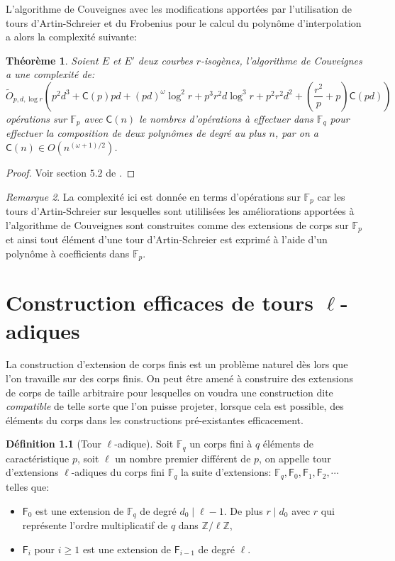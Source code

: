 \documentclass[10pt,a4paper]{book}
\theoremstyle{plain}
\newtheorem{thm}{Théorème}[chapter]
\theoremstyle{definition}
\theoremstyle{definition}
\theoremstyle{definition}
\theoremstyle{definition}
\newtheorem{defi}[thm]{Définition}
\theoremstyle{remark}
\newtheorem{rem}[thm]{Remarque}
\theoremstyle{remark}
\theoremstyle{definition}
\begin{document}
L'algorithme de Couveignes avec les modifications apportées par l'utilisation de tours d'Artin-Schreier et du Frobenius pour le calcul du polynôme d'interpolation a alors la complexité suivante:

\begin{thm}
Soient $E$ et $E'$ deux courbes $r$-isogènes, l'algorithme de Couveignes a une complexité de:
\[
\tilde{O}_{p,d,\log r}(p^2d^3+\mathsf{C}(p)pd+(pd)^{\omega}\log^2 r + p^3 r^2 d \log^3 r + p^2r^2d^2+(\frac{r^2}{p}+p)\mathsf{C}(pd))
\]
opérations sur $\mathbb{F}_p$ avec $\mathsf{C}(n)$ le nombres d'opérations à effectuer dans $\mathbb{F}_q$ pour effectuer la composition de deux polynômes de degré au plus $n$, par \cite{BrentKung78} on a $\mathsf{C}(n) \in O(n^{(\omega+1)/2})$.
\end{thm}

\begin{proof}
Voir section $5.2$ de \cite{DeFeo11}.
\end{proof}

\begin{rem}
La complexité ici est donnée en terms d'opérations sur $\mathbb{F}_p$ car les 
tours d'Artin-Schreier sur lesquelles sont utililisées les améliorations 
apportées à l'algorithme de Couveignes sont construites comme des extensions de
corps sur $\mathbb{F}_p$ et ainsi tout élément d'une tour d'Artin-Schreier est
exprimé à l'aide d'un polynôme à coefficients dans $\mathbb{F}_p$.
\end{rem}

\chapter{Construction efficaces de tours $\ell$-adiques}
\label{cha:tour}
La construction d'extension de corps finis est un problème naturel dès lors que l'on travaille sur des corps finis. On peut être amené à construire des extensions de corps de taille arbitraire pour lesquelles on voudra une construction dite \textit{compatible} de telle sorte que l'on puisse projeter, lorsque cela est possible, des éléments du corps dans les constructions pré-existantes efficacement.

\begin{defi}[Tour \textit{$\ell$}-adique]
\label{def:tour-ell}
Soit $\mathbb{F}_q$ un corps fini à $q$ éléments de caractéristique $p$, soit $\ell$ un nombre premier différent de $p$, on appelle tour d'extensions $\ell$-adiques du corps fini $\mathbb{F}_q$ la suite d'extensions: $\mathbb{F}_q, \mathsf{F}_{0}, \mathsf{F}_{1}, \mathsf{F}_{2}, \cdots$ telles que:
\begin{itemize}
\item $\mathsf{F}_{0}$ est une extension de $\mathbb{F}_q$ de degré $d_0 \mid \ell-1$. De plus $r \mid d_0$ avec $r$ qui représente l'ordre multiplicatif de $q$ dans $\mathbb{Z}/\ell \mathbb{Z}$,
\item $\mathsf{F}_{i}$ pour $i \geqslant 1$ est une extension de $\mathsf{F}_{i-1}$ de degré $\ell$.
\end{itemize}
\end{defi}
\end{document}
